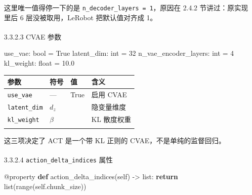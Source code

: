 \documentclass[
  chinese,
]{ctexart}
\makeatletter
\let\oldparagraph\paragraph
\renewcommand{\paragraph}{
    \@ifstar
      \xxxParagraphStar
      \xxxParagraphNoStar
  }
\newcommand{\xxxParagraphStar}[1]{\oldparagraph*{#1}\mbox{}}
\newcommand{\xxxParagraphNoStar}[1]{\oldparagraph{#1}\mbox{}}
\newenvironment{Shaded}{\begin{snugshade}}{\end{snugshade}}
\newcommand{\AttributeTok}[1]{\textcolor[rgb]{0.40,0.45,0.13}{#1}}
\newcommand{\BuiltInTok}[1]{\textcolor[rgb]{0.00,0.23,0.31}{#1}}
\newcommand{\ControlFlowTok}[1]{\textcolor[rgb]{0.00,0.23,0.31}{\textbf{#1}}}
\newcommand{\DecValTok}[1]{\textcolor[rgb]{0.68,0.00,0.00}{#1}}
\newcommand{\FloatTok}[1]{\textcolor[rgb]{0.68,0.00,0.00}{#1}}
\newcommand{\KeywordTok}[1]{\textcolor[rgb]{0.00,0.23,0.31}{\textbf{#1}}}
\newcommand{\NormalTok}[1]{\textcolor[rgb]{0.00,0.23,0.31}{#1}}
\newcommand{\OperatorTok}[1]{\textcolor[rgb]{0.37,0.37,0.37}{#1}}
\newcommand{\VariableTok}[1]{\textcolor[rgb]{0.07,0.07,0.07}{#1}}
\makeatother
\begin{document}
这里唯一值得停一下的是 \texttt{n\_decoder\_layers\ =\ 1}，原因在 2.4.2
节讲过：原实现里后 6 层没被取用，LeRobot 把默认值对齐成 1。

\paragraph{3.3.2.3 CVAE 参数}\label{cvae-ux53c2ux6570}

\begin{Shaded}
\begin{Highlighting}[]
\NormalTok{use\_vae: }\BuiltInTok{bool} \OperatorTok{=} \VariableTok{True}
\NormalTok{latent\_dim: }\BuiltInTok{int} \OperatorTok{=} \DecValTok{32}
\NormalTok{n\_vae\_encoder\_layers: }\BuiltInTok{int} \OperatorTok{=} \DecValTok{4}
\NormalTok{kl\_weight: }\BuiltInTok{float} \OperatorTok{=} \FloatTok{10.0}
\end{Highlighting}
\end{Shaded}

\begin{center}
\begin{tabular}{@{}>{\raggedright\arraybackslash}p{} >{\raggedright\arraybackslash}p{} >{\raggedright\arraybackslash}p{} >{\raggedright\arraybackslash}p{}@{}}
\toprule\noalign{}
参数 & 符号 & 值 & 含义 \\
\midrule\noalign{}
\texttt{use\_\allowbreak vae} & --- & True & 启用 CVAE \\
\texttt{latent\_\allowbreak dim} & \(d_z\) & 32 & 隐变量维度 \\
\texttt{kl\_\allowbreak weight} & \(\beta\) & 10.0 & KL 散度权重 \\
\bottomrule\noalign{}
\end{tabular}
\end{center}

这三项决定了 ACT 是一个带 KL 正则的 CVAE，不是单纯的监督回归。

\paragraph{\texorpdfstring{3.3.2.4 \texttt{action\_delta\_indices}
属性}{3.3.2.4 action\_delta\_indices 属性}}\label{action_delta_indices-ux5c5eux6027}

\begin{Shaded}
\begin{Highlighting}[]
\AttributeTok{@property}
\KeywordTok{def}\NormalTok{ action\_delta\_indices(}\VariableTok{self}\NormalTok{) }\OperatorTok{{-}\textgreater{}} \BuiltInTok{list}\NormalTok{:}
    \ControlFlowTok{return} \BuiltInTok{list}\NormalTok{(}\BuiltInTok{range}\NormalTok{(}\VariableTok{self}\NormalTok{.chunk\_size))}
\end{Highlighting}
\end{Shaded}
\end{document}
